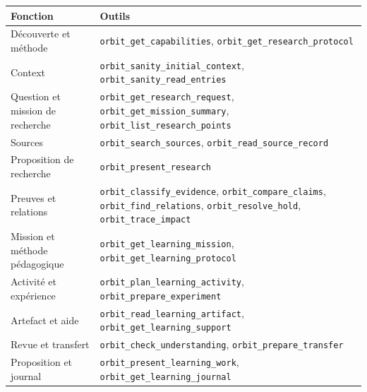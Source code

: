 \documentclass[
  canadien,
  11pt,
  a4paper,
]{report}
\newcounter{none} %
\begin{document}
{\def\LTcaptype{none} %
\begin{longtable}[]{@{}
  >{\raggedright\arraybackslash}p{}
  >{\raggedright\arraybackslash}p{}@{}}
\toprule\noalign{}
\begin{minipage}[b]{\linewidth}\raggedright
Fonction
\end{minipage} & \begin{minipage}[b]{\linewidth}\raggedright
Outils
\end{minipage} \\
\midrule\noalign{}
\endhead
\bottomrule\noalign{}
\endlastfoot
Découverte et méthode & \texttt{orbit\_\allowbreak{}get\_\allowbreak{}capabilities},
\texttt{orbit\_\allowbreak{}get\_\allowbreak{}research\_\allowbreak{}protocol} \\
Context & \texttt{orbit\_\allowbreak{}sanity\_\allowbreak{}initial\_\allowbreak{}context},
\texttt{orbit\_\allowbreak{}sanity\_\allowbreak{}read\_\allowbreak{}entries} \\
Question et mission de recherche &
\texttt{orbit\_\allowbreak{}get\_\allowbreak{}research\_\allowbreak{}request},
\texttt{orbit\_\allowbreak{}get\_\allowbreak{}mission\_\allowbreak{}summary},
\texttt{orbit\_\allowbreak{}list\_\allowbreak{}research\_\allowbreak{}points} \\
Sources & \texttt{orbit\_\allowbreak{}search\_\allowbreak{}sources},
\texttt{orbit\_\allowbreak{}read\_\allowbreak{}source\_\allowbreak{}record} \\
Proposition de recherche & \texttt{orbit\_\allowbreak{}present\_\allowbreak{}research} \\
Preuves et relations & \texttt{orbit\_\allowbreak{}classify\_\allowbreak{}evidence},
\texttt{orbit\_\allowbreak{}compare\_\allowbreak{}claims}, \texttt{orbit\_\allowbreak{}find\_\allowbreak{}relations},
\texttt{orbit\_\allowbreak{}resolve\_\allowbreak{}hold}, \texttt{orbit\_\allowbreak{}trace\_\allowbreak{}impact} \\
Mission et méthode pédagogique & \texttt{orbit\_\allowbreak{}get\_\allowbreak{}learning\_\allowbreak{}mission},
\texttt{orbit\_\allowbreak{}get\_\allowbreak{}learning\_\allowbreak{}protocol} \\
Activité et expérience & \texttt{orbit\_\allowbreak{}plan\_\allowbreak{}learning\_\allowbreak{}activity},
\texttt{orbit\_\allowbreak{}prepare\_\allowbreak{}experiment} \\
Artefact et aide & \texttt{orbit\_\allowbreak{}read\_\allowbreak{}learning\_\allowbreak{}artifact},
\texttt{orbit\_\allowbreak{}get\_\allowbreak{}learning\_\allowbreak{}support} \\
Revue et transfert & \texttt{orbit\_\allowbreak{}check\_\allowbreak{}understanding},
\texttt{orbit\_\allowbreak{}prepare\_\allowbreak{}transfer} \\
Proposition et journal & \texttt{orbit\_\allowbreak{}present\_\allowbreak{}learning\_\allowbreak{}work},
\texttt{orbit\_\allowbreak{}get\_\allowbreak{}learning\_\allowbreak{}journal} \\
\end{longtable}
}
\end{document}
